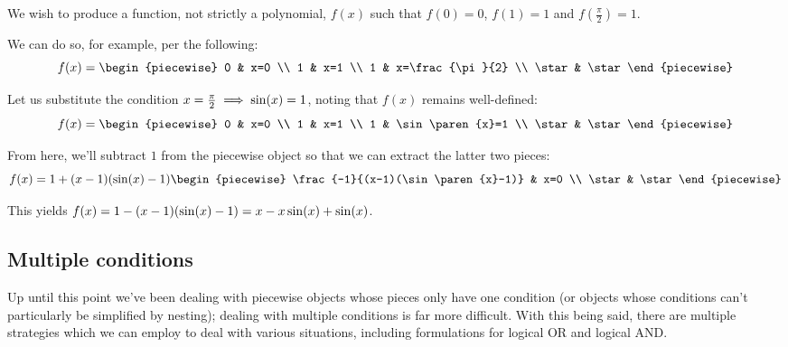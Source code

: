 \begin{example}
    We wish to produce a function, not strictly a polynomial, $f(x)$ such that $f(0)=0$, $f(1)=1$ and $f(\frac{\pi}{2})=1$.

    We can do so, for example, per the following:
    $$
        f(x) = \begin{piecewise}
            0 & x=0 \\
            1 & x=1 \\
            1 & x=\frac{\pi}{2} \\
            \star & \star
        \end{piecewise}
    $$

    Let us substitute the condition $x=\frac{\pi}{2}\implies \sin(x)=1$, noting that $f(x)$ remains well-defined:
    $$
        f(x) = \begin{piecewise}
            0 & x=0 \\
            1 & x=1 \\
            1 & \sin\paren{x}=1 \\
            \star & \star
        \end{piecewise}
    $$

    From here, we'll subtract $1$ from the piecewise object so that we can extract the latter two pieces:
    $$
        f(x) = 1+(x-1)(\sin\paren{x}-1)\begin{piecewise}
            \frac{-1}{(x-1)(\sin\paren{x}-1)} & x=0 \\
            \star & \star
        \end{piecewise}
    $$

    This yields $f(x)=1-(x-1)(\sin(x)-1)=x-x\sin(x)+\sin(x)$.
\end{example}
\subsection{Multiple conditions}
Up until this point we've been dealing with piecewise objects whose pieces only have one condition (or objects whose conditions can't particularly be simplified by nesting); dealing with multiple conditions is far more difficult. With this being said, there are multiple strategies which we can employ to deal with various situations, including formulations for logical OR and logical AND.

